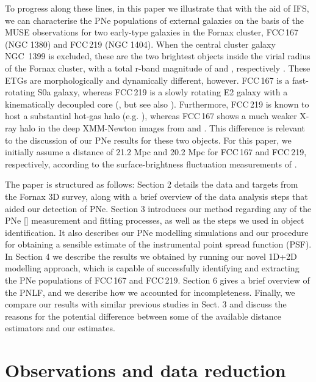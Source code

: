 \documentclass{aa}
\begin{document}
To progress along these lines, in this paper we illustrate that with the aid of IFS, we can characterise the PNe populations of external galaxies on the basis of the MUSE observations for two early-type galaxies in the Fornax cluster, FCC\,167 (NGC 1380) and FCC\,219 (NGC 1404). When the central cluster galaxy NGC~1399 is excluded, these are the two brightest objects inside the virial radius of the Fornax cluster, with a total r-band magnitude of  and , respectively \citep{iodice_fornax_2019}. These ETGs are morphologically and dynamically different, however. FCC\,167 is a fast-rotating S0a galaxy, whereas FCC\,219 is a slowly rotating E2 galaxy with a kinematically decoupled core (\citealp{ricci_ifu_2016}, but see also \citealp{iodice_fornax3d_2019}). Furthermore, FCC\,219 is known to host a substantial hot-gas halo (e.g. \citealp{machacek_infall_2005}), whereas FCC\,167 shows a much weaker X-ray halo in the deep XMM-Newton images from \citet{murakami_suzaku_2011} and \citet{su_gas_2017}. This difference is relevant to the discussion of our PNe results for these two objects. For this paper, we initially assume a distance of 21.2 Mpc and 20.2 Mpc for FCC\,167 and FCC\,219, respectively, according to the surface-brightness fluctuation measurements of \citet{blakeslee_acs_2009}.


The paper is structured as follows: Section 2 details the data and targets from the Fornax 3D survey, along with a brief overview of the data analysis steps that aided our detection of PNe. Section 3 introduces our method regarding any of the PNe [] measurement and fitting processes, as well as the steps we used in object identification. It also describes our PNe modelling simulations and our procedure for obtaining a sensible estimate of the instrumental point spread function (PSF). In Section 4 we describe the results we obtained by running our novel 1D+2D modelling approach, which is capable of successfully identifying and extracting the PNe populations of FCC\,167 and FCC\,219. Section 6 gives a brief overview of the PNLF, and we describe how we accounted for incompleteness. Finally, we compare our results with similar previous studies in Sect. 3 and discuss the reasons for the potential difference between some of the available distance estimators and our estimates.

\section{Observations and data reduction}
\end{document}
